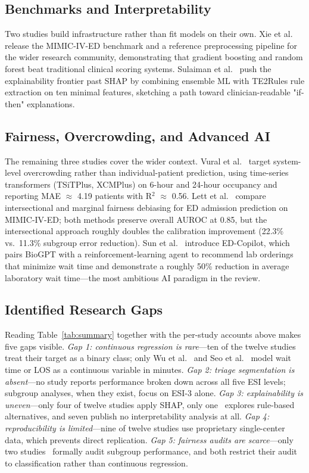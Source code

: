 \documentclass[conference]{IEEEtran}
\begin{document}
\subsection{Benchmarks and Interpretability}
Two studies build infrastructure rather than fit models on their own. Xie
et al.~\cite{xie2022} release the MIMIC-IV-ED benchmark and a reference
preprocessing pipeline for the wider research community, demonstrating that
gradient boosting and random forest beat traditional clinical scoring
systems. Sulaiman et al.~\cite{sulaiman2025} push the explainability
frontier past SHAP by combining ensemble ML with TE2Rules rule extraction on
ten minimal features, sketching a path toward clinician-readable
"if-then" explanations.

\subsection{Fairness, Overcrowding, and Advanced AI}
The remaining three studies cover the wider context. Vural
et al.~\cite{vural2025} target system-level overcrowding rather than
individual-patient prediction, using time-series transformers (TSiTPlus,
XCMPlus) on 6-hour and 24-hour occupancy and reporting MAE $\approx$ 4.19
patients with R$^2$ $\approx$ 0.56. Lett et al.~\cite{lett2025} compare
intersectional and marginal fairness debiasing for ED admission prediction
on MIMIC-IV-ED; both methods preserve overall AUROC at 0.85, but the
intersectional approach roughly doubles the calibration improvement (22.3\%
vs.~11.3\% subgroup error reduction). Sun et al.~\cite{sun2024} introduce
ED-Copilot, which pairs BioGPT with a reinforcement-learning agent to
recommend lab orderings that minimize wait time and demonstrate a roughly
50\% reduction in average laboratory wait time---the most ambitious AI
paradigm in the review.

\subsection{Identified Research Gaps}
Reading Table~\ref{tab:summary} together with the per-study accounts above
makes five gaps visible. \textit{Gap 1: continuous regression is rare}---ten
of the twelve studies treat their target as a binary class; only Wu et
al.~\cite{wu2025} and Seo et al.~\cite{seo2024} model wait time or LOS as a
continuous variable in minutes. \textit{Gap 2: triage segmentation is
absent}---no study reports performance broken down across all five ESI
levels; subgroup analyses, when they exist, focus on ESI-3 alone.
\textit{Gap 3: explainability is uneven}---only four of twelve studies apply
SHAP, only one~\cite{sulaiman2025} explores rule-based alternatives, and
seven publish no interpretability analysis at all. \textit{Gap 4:
reproducibility is limited}---nine of twelve studies use proprietary
single-center data, which prevents direct replication. \textit{Gap 5:
fairness audits are scarce}---only two studies~\cite{wang2025fair, lett2025}
formally audit subgroup performance, and both restrict their audit to
classification rather than continuous regression.
\end{document}
